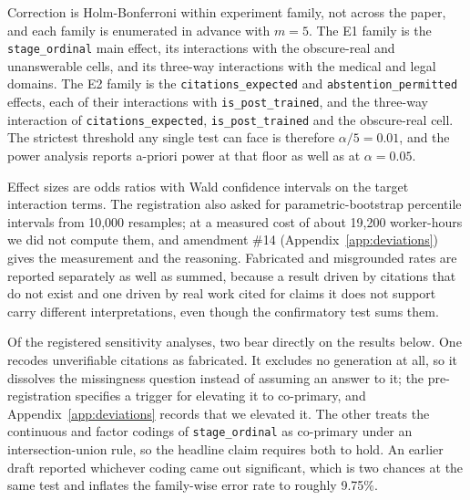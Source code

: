 Correction is Holm-Bonferroni within experiment family, not across the paper,
and each family is enumerated in advance with $m = 5$. The E1 family is the
\texttt{stage\_ordinal} main effect, its interactions with the obscure-real and
unanswerable cells, and its three-way interactions with the medical and legal
domains. The E2 family is the \texttt{citations\_expected} and
\texttt{abstention\_permitted} effects, each of their interactions with
\texttt{is\_post\_trained}, and the three-way interaction of
\texttt{citations\_expected}, \texttt{is\_post\_trained} and the obscure-real
cell. The strictest threshold any single test can face is therefore $\alpha/5 =
0.01$, and the power analysis reports a-priori power at that floor as well as at
$\alpha = 0.05$.

Effect sizes are odds ratios with Wald confidence intervals on the target
interaction terms. The registration also asked for parametric-bootstrap
percentile intervals from 10,000 resamples; at a measured cost of about 19,200
worker-hours we did not compute them, and amendment \#14
(Appendix~\ref{app:deviations}) gives the measurement and the reasoning. Fabricated and misgrounded rates are reported
separately as well as summed, because a result driven by citations that do not
exist and one driven by real work cited for claims it does not support carry
different interpretations, even though the confirmatory test sums them.

Of the registered sensitivity analyses, two bear directly on the results below.
One recodes unverifiable citations as fabricated. It excludes no generation at
all, so it dissolves the missingness question instead of assuming an answer to
it; the pre-registration specifies a trigger for elevating it to co-primary, and
Appendix~\ref{app:deviations} records that we elevated it. The other treats the
continuous and factor codings of \texttt{stage\_ordinal} as co-primary under an
intersection-union rule, so the headline claim requires both to hold. An earlier
draft reported whichever coding came out significant, which is two chances at
the same test and inflates the family-wise error rate to roughly 9.75\%.
